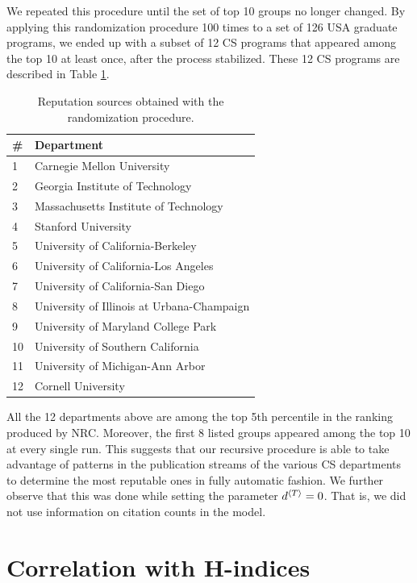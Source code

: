 \documentclass[notitlepage]{svjour3}
\begin{document}
We repeated this procedure until the set of top 10 groups no longer changed.
By applying this randomization procedure 100 times to a set of 126 USA graduate programs, 
we ended up with a subset of 12 CS programs that appeared 
among the top 10 at least once, after the process stabilized. These 12 CS programs are
described in Table \ref{tab:departments}.

\begin{table}[h!]
 \centering
 \begin{tabular}{l l} 
 \toprule
 \# & Department \\ 
 \midrule
 1  & Carnegie Mellon University \\
 2  & Georgia Institute of Technology \\
 3  & Massachusetts Institute of Technology \\
 4  & Stanford University \\
 5  & University of California-Berkeley \\
 6  & University of California-Los Angeles \\
 7  & University of California-San Diego \\
 8  & University of Illinois at Urbana-Champaign \\
 9  & University of Maryland College Park \\
 10 & University of Southern California \\
 11 & University of Michigan-Ann Arbor \\
 12 & Cornell University \\
 \bottomrule
 \end{tabular}
 \caption{Reputation sources obtained with the randomization procedure.}
 \label{tab:departments}
\end{table}

All the 12 departments above are among the top 5th percentile in the ranking produced by NRC. 
Moreover, the first 8 listed groups appeared among the top 10 at every single run.
This suggests that our recursive procedure is able to take advantage of patterns in the publication 
streams of the various CS departments to determine the most reputable ones in fully automatic fashion.
We further observe that this was done while setting the parameter $d{^{\langle T \rangle}} = 0$. That is, we did 
not use information on citation counts in the model. 

\section{Correlation with H-indices} 
\label{sec:correlation}
\end{document}
